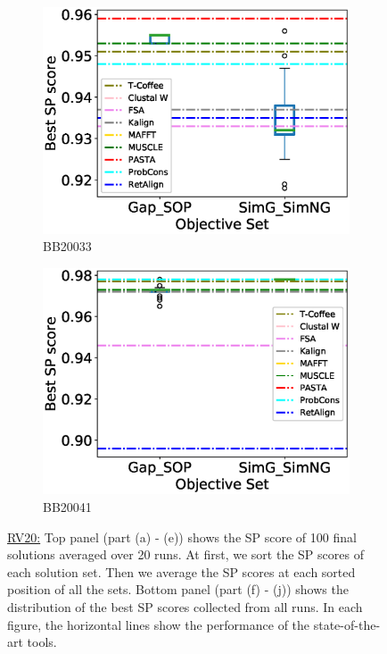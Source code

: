 \begin{figure}[!htbp]
\begin{adjustwidth}{-1.5cm}{-1cm}
\begin{subfigure}{0.22\textwidth}
			\includegraphics[width=\columnwidth]{Figure/summary/precomputedInit/Balibase/BB20033_objset_pairs_rank_2}
			\caption{BB20033}
		\end{subfigure}
		\begin{subfigure}{0.22\textwidth}
			\includegraphics[width=\columnwidth]{Figure/summary/precomputedInit/Balibase/BB20041_objset_pairs_rank_2}
			\caption{BB20041}
		\end{subfigure}
		\end{adjustwidth}
		\caption[SP score results on RV20]{\underline{RV20:} Top panel (part (a) - (e)) shows the SP score of 100 final solutions averaged over 20 runs. At first, we sort the SP scores of each solution set. Then we average the SP scores at each sorted position of all the sets. Bottom panel (part (f) - (j)) shows the distribution of the best SP scores collected from all runs. In each figure, the horizontal lines show the performance of the state-of-the-art tools.}
		\label{fig:rv20_sp}

\end{figure}


